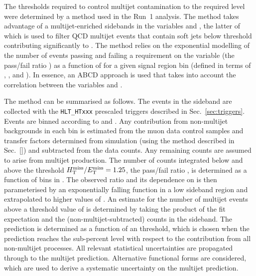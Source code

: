 The \alphat thresholds required to control multijet contamination to
the required level were determined by a method used in the Run~1
analysis. The method takes advantage of a multijet-enriched sidebands
in the variables \alphat and \mhtmet, the latter of which is used to
filter QCD multijet events that contain soft jets below threshold
contributing significantly to \mht. The method relies on the
exponential modelling of the number of events passing and failing a
requirement on the variable \mhtmet (\ie the pass/fail ratio \rmhtmet)
as a function of \alphat for a given signal region bin (defined in
terms of \njet, \nb, and \scalht). In essence, an ABCD approach is
used that takes into account the correlation between the variables
\rmhtmet and \alphat.

The method can be summarised as follows. The events in the sideband
are collected with the \texttt{HLT\_HTxxx} prescaled triggers
described in Sec.~\ref{sec:triggers}. Events are binned according to \alphat
and \mhtmet. Any contribution from non-multijet backgrounds in each
bin is estimated from the muon data control samples and transfer
factors determined from simulation (using the method described in
Sec.~\ref{}) and subtracted from the data counts. Any remaining counts
are assumed to arise from multijet production. The number of counts
integrated below and above the threshold $\mhtmet = 1.25$, \ie the
pass/fail ratio \rmhtmet, is determined as a function of bins in
\alphat. The observed ratio and its dependence on \alphat is then
parameterised by an exponentially falling function in a low \alphat
sideband region and extrapolated to higher values of \alphat. An
estimate for the number of multijet events above a threshold value of
\alphat is determined by taking the product of the fit expectation and
the (non-multijet-subtracted) counts in the \mhtmet sideband. The
prediction is determined as a function of an \alphat threshold, which
is chosen when the prediction reaches the sub-percent level with
respect to the contribution from all non-multijet processes. All
relevant statistical uncertainties are propagated through to the
multijet prediction. Alternative functional forms are considered,
which are used to derive a systematic uncertainty on the multijet
prediction. 

